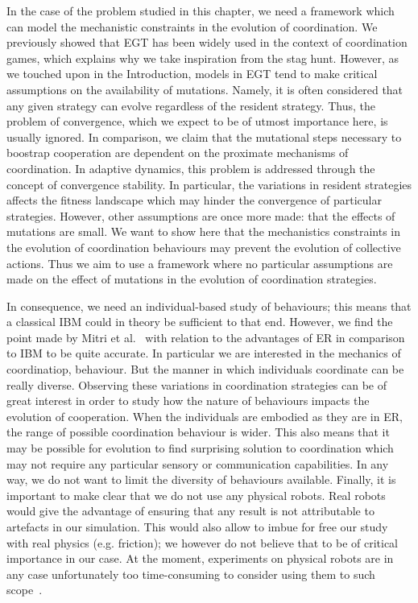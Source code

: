     In the case of the problem studied in this chapter, we need a framework which can model the mechanistic constraints in the evolution of coordination. We previously showed that EGT has been widely used in the context of coordination games, which explains why we take inspiration from the stag hunt. However, as we touched upon in the Introduction, models in EGT tend to make critical assumptions on the availability of mutations. Namely, it is often considered that any given strategy can evolve regardless of the resident strategy. Thus, the problem of convergence, which we expect to be of utmost importance here, is usually ignored. In comparison, we claim that the mutational steps necessary to boostrap cooperation are dependent on the proximate mechanisms of coordination. In adaptive dynamics, this problem is addressed through the concept of convergence stability. In particular, the variations in resident strategies affects the fitness landscape which may hinder the convergence of particular strategies. However, other assumptions are once more made: that the effects of mutations are small. We want to show here that the mechanistics constraints in the evolution of coordination behaviours may prevent the evolution of collective actions. Thus we aim to use a framework where no particular assumptions are made on the effect of mutations in the evolution of coordination strategies.

    In consequence, we need an individual-based study of behaviours; this means that a classical IBM could in theory be sufficient to that end. However, we find the point made by Mitri et al.~\parencite{Mitri2012} with relation to the advantages of ER in comparison to IBM to be quite accurate. In particular we are interested in the mechanics of coordinatiop, behaviour. But the manner in which individuals coordinate can be really diverse. Observing these variations in coordination strategies can be of great interest in order to study how the nature of behaviours impacts the evolution of cooperation. When the individuals are embodied as they are in ER, the range of possible coordination behaviour is wider. This also means that it may be possible for evolution to find surprising solution to coordination which may not require any particular sensory or communication capabilities. In any way, we do not want to limit the diversity of behaviours available. Finally, it is important to make clear that we do not use any physical robots. Real robots would give the advantage of ensuring that any result is not attributable to artefacts in our simulation. This would also allow to imbue for free our study with real physics (e.g. friction); we however do not believe that to be of critical importance in our case. At the moment, experiments on physical robots are in any case unfortunately too time-consuming to consider using them to such scope~\parencite{Mitri2012, Doncieux2015}.



